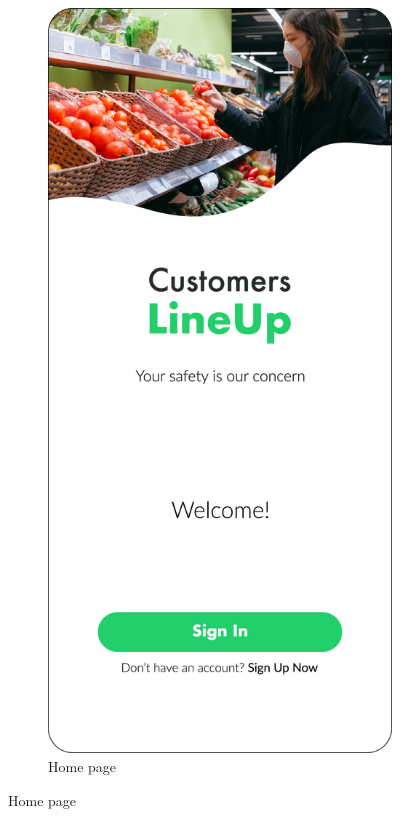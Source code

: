 \begin{figure}[H]
    \centering
    \begin{subfigure}[t]{0.28\textwidth} 
        \includegraphics{../mockups/home}
        \caption*{Home page}

\end{subfigure}
\end{figure}
